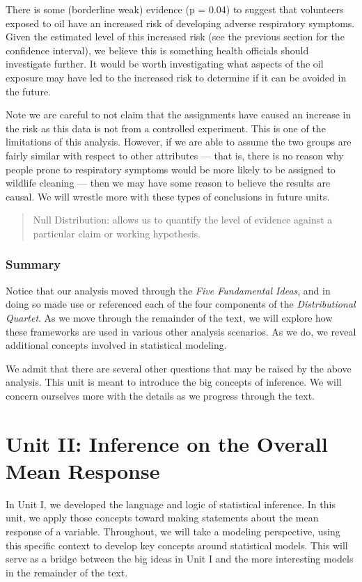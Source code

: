 \documentclass[
  letterpaper,
  DIV=11,
  numbers=noendperiod]{scrreprt}
\theoremstyle{plain}
\theoremstyle{definition}
\theoremstyle{definition}
\theoremstyle{remark}
\begin{document}
There is some (borderline weak) evidence (p = 0.04) to suggest that
volunteers exposed to oil have an increased risk of developing adverse
respiratory symptoms. Given the estimated level of this increased risk
(see the previous section for the confidence interval), we believe this
is something health officials should investigate further. It would be
worth investigating what aspects of the oil exposure may have led to the
increased risk to determine if it can be avoided in the future.

Note we are careful to not claim that the assignments have caused an
increase in the risk as this data is not from a controlled experiment.
This is one of the limitations of this analysis. However, if we are able
to assume the two groups are fairly similar with respect to other
attributes --- that is, there is no reason why people prone to
respiratory symptoms would be more likely to be assigned to wildlife
cleaning --- then we may have some reason to believe the results are
causal. We will wrestle more with these types of conclusions in future
units.

\begin{quote}
Null Distribution: allows us to quantify the level of evidence against a
particular claim or working hypothesis.
\end{quote}

\section{Summary}\label{summary}

Notice that our analysis moved through the \emph{Five Fundamental
Ideas}, and in doing so made use or referenced each of the four
components of the \emph{Distributional Quartet}. As we move through the
remainder of the text, we will explore how these frameworks are used in
various other analysis scenarios. As we do, we reveal additional
concepts involved in statistical modeling.

We admit that there are several other questions that may be raised by
the above analysis. This unit is meant to introduce the big concepts of
inference. We will concern ourselves more with the details as we
progress through the text.

\part{Unit II: Inference on the Overall Mean Response}

In Unit I, we developed the language and logic of statistical inference.
In this unit, we apply those concepts toward making statements about the
mean response of a variable. Throughout, we will take a modeling
perspective, using this specific context to develop key concepts around
statistical models. This will serve as a bridge between the big ideas in
Unit I and the more interesting models in the remainder of the text.
\end{document}
